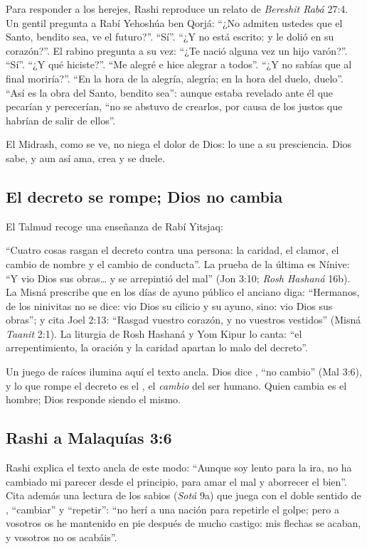 Para responder a los herejes, Rashi reproduce un relato de \emph{Bereshit Rabá} 27:4. Un gentil pregunta a Rabí Yehoshúa ben Qorjá: ``¿No admiten ustedes que el Santo, bendito sea, ve el futuro?''. ``Sí''. ``¿Y no está escrito: y le dolió en su corazón?''. El rabino pregunta a su vez: ``¿Te nació alguna vez un hijo varón?''. ``Sí''. ``¿Y qué hiciste?''. ``Me alegré e hice alegrar a todos''. ``¿Y no sabías que al final moriría?''. ``En la hora de la alegría, alegría; en la hora del duelo, duelo''. ``Así es la obra del Santo, bendito sea'': aunque estaba revelado ante él que pecarían y perecerían, ``no se abstuvo de crearlos, por causa de los justos que habrían de salir de ellos''.

El Midrash, como se ve, no niega el dolor de Dios: lo une a su presciencia. Dios sabe, y aun así ama, crea y se duele.

\subsection{El decreto se rompe; Dios no cambia}
El Talmud recoge una enseñanza de Rabí Yitsjaq:


``Cuatro cosas rasgan el decreto contra una persona: la caridad, el clamor, el cambio de nombre y el cambio de conducta''. La prueba de la última es Nínive: ``Y vio Dios sus obras\ldots{} y se arrepintió del mal'' (Jon 3:10; \emph{Rosh Hashaná} 16b). La Misná prescribe que en los días de ayuno público el anciano diga: ``Hermanos, de los ninivitas no se dice: vio Dios su cilicio y su ayuno, sino: vio Dios sus obras''; y cita Joel 2:13: ``Rasgad vuestro corazón, y no vuestros vestidos'' (Misná \emph{Taanit} 2:1). La liturgia de Rosh Hashaná y Yom Kipur lo canta: ``el arrepentimiento, la oración y la caridad apartan lo malo del decreto''.

Un juego de raíces ilumina aquí el texto ancla. Dios dice , ``no cambio'' (Mal 3:6), y lo que rompe el decreto es el , el \emph{cambio} del ser humano. Quien cambia es el hombre; Dios responde siendo el mismo.


\subsection{Rashi a Malaquías 3:6}
Rashi explica el texto ancla de este modo: ``Aunque soy lento para la ira, no ha cambiado mi parecer desde el principio, para amar el mal y aborrecer el bien''. Cita además una lectura de los sabios (\emph{Sotá} 9a) que juega con el doble sentido de , ``cambiar'' y ``repetir'': ``no herí a una nación para repetirle el golpe; pero a vosotros os he mantenido en pie después de mucho castigo: mis flechas se acaban, y vosotros no os acabáis''.

